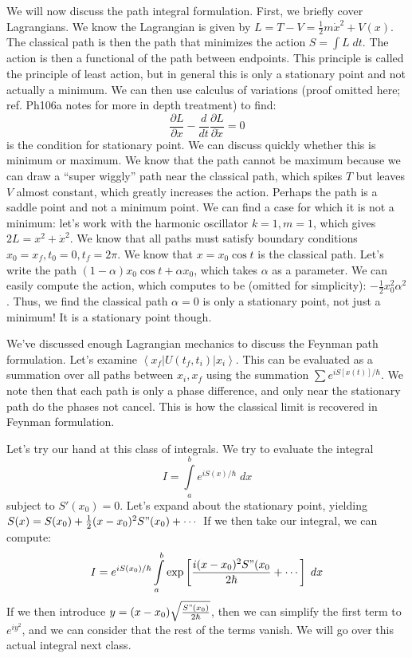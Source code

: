 \documentclass[10pt]{report}
\newcommand{\bra}[1]{\left<#1\right|}
\newcommand{\ket}[1]{\left|#1\right>}
\newcommand{\rd}[2]{\frac{d#1}{d#2}}
\newcommand{\pd}[2]{\frac{\partial #1}{\partial#2}}
\begin{document}
We will now discuss the path integral formulation. First, we briefly cover Lagrangians. We know the Lagrangian is given by $L=T-V = \frac{1}{2}m\dot{x}^2 + V(x)$. The classical path is then the path that minimizes the action $S = \int L \;dt$. The action is then a functional of the path between endpoints. This principle is called the principle of least action, but in general this is only a stationary point and not actually a minimum. We can then use calculus of variations (proof omitted here; ref. Ph106a notes for more in depth treatment) to find:
$$\pd{L}{x} - \rd{}{t} \pd{L}{\dot{x}} = 0$$
is the condition for stationary point. We can discuss quickly whether this is minimum or maximum. We know that the path cannot be maximum because we can draw a ``super wiggly'' path near the classical path, which spikes $T$ but leaves $V$ almost constant, which greatly increases the action. Perhaps the path is a saddle point and not a minimum point. We can find a case for which it is not a minimum: let's work with the harmonic oscillator $k=1, m=1$, which gives $2L = x^2 + \dot{x}^2$. We know that all paths must satisfy boundary conditions $x_0 = x_f, t_0 = 0, t_f = 2\pi$. We know that $x=x_0\cos t$ is the classical path. Let's write the path $(1-\alpha)x_0\cos t + \alpha x_0$, which takes $\alpha$ as a parameter. We can easily compute the action, which computes to be (omitted for simplicity): $-\frac{1}{2}x_0^2\alpha^2$. Thus, we find the classical path $\alpha = 0$ is only a stationary point, not just a minimum! It is a stationary point though. 

We've discussed enough Lagrangian mechanics to discuss the Feynman path formulation. Let's examine $\bra{x_f} U(t_f,t_i) \ket{x_i}$. This can be evaluated as a summation over all paths between $x_i,x_f$ using the summation $\sum e^{iS[x(t)]/\hbar}$. We note then that each path is only a phase difference, and only near the stationary path do the phases not cancel. This is how the classical limit is recovered in Feynman formulation. 

Let's try our hand at this class of integrals. We try to evaluate the integral 
$$I = \displaystyle\int\limits_{a}^{b}e^{iS(x)/\hbar}\;dx$$
subject to $S'(x_0) = 0$. Let's expand about the stationary point, yielding $S(x) = S(x_0) + \frac{1}{2}(x-x_0)^2S"(x_0) + \cdots$
If we then take our integral, we can compute:
$$I = e^{iS(x_0)/\hbar} \displaystyle\int\limits_{a}^{b}\exp\left[ \frac{i(x-x_0)^2S"(x_0}{2\hbar} + \cdots \right]\;dx$$
If we then introduce $y = (x-x_0)\sqrt{\frac{S"(x_0)}{2\hbar}}$, then we can simplify the first term to $e^{iy^2}$, and we can consider that the rest of the terms vanish. We will go over this actual integral next class.
\end{document}
